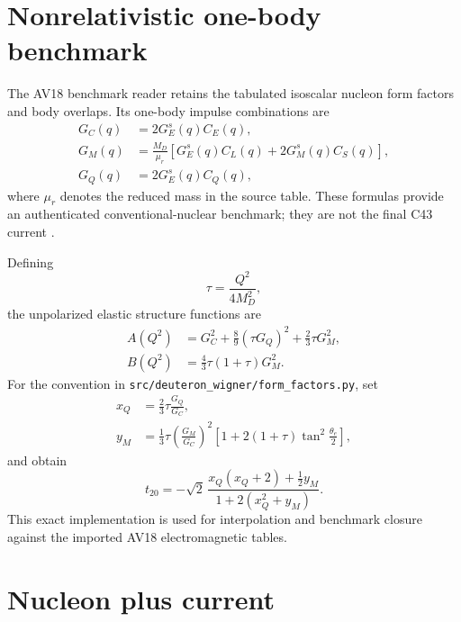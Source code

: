 \documentclass[11pt,oneside]{book}
\newcommand{\codepath}[1]{\nolinkurl{#1}}
\newcommand{\statuscode}[1]{\text{\ttfamily\detokenize{#1}}}
\begin{document}
\section{Nonrelativistic one-body benchmark}

The AV18 benchmark reader retains the tabulated isoscalar nucleon form factors and body overlaps.  Its one-body impulse combinations are
\begin{align}
 G_C(q)&=2G_E^s(q)C_E(q),
 \label{eq:gc-impulse}\\
 G_M(q)&=\frac{M_D}{\mu_r}
 \left[G_E^s(q)C_L(q)+2G_M^s(q)C_S(q)\right],
 \label{eq:gm-impulse}\\
 G_Q(q)&=2G_E^s(q)C_Q(q),
 \label{eq:gq-impulse}
\end{align}
where $\mu_r$ denotes the reduced mass in the source table.  These formulas provide an authenticated conventional-nuclear benchmark; they are not the final C43 current \cite{WiringaStoksSchiavilla1995,Kelly2004,DWProductionBoundary2026}.

Defining
\begin{equation}
 \tau=\frac{Q^2}{4M_D^2},
\end{equation}
the unpolarized elastic structure functions are
\begin{align}
 A(Q^2)&=G_C^2+\frac{8}{9}(\tau G_Q)^2+\frac{2}{3}\tau G_M^2,
 \label{eq:elastic-A}\\
 B(Q^2)&=\frac{4}{3}\tau(1+\tau)G_M^2.
 \label{eq:elastic-B}
\end{align}
For the \statuscode{elastic_observables} convention in \codepath{src/deuteron_wigner/form_factors.py}, set
\begin{align}
 x_Q&=\frac{2}{3}\tau\frac{G_Q}{G_C},\\
 y_M&=\frac{1}{3}\tau\left(\frac{G_M}{G_C}\right)^2
 \left[1+2(1+\tau)\tan^2\frac{\theta_e}{2}\right],
\end{align}
and obtain
\begin{equation}
 t_{20}=-\sqrt{2}\,
 \frac{x_Q(x_Q+2)+\frac12y_M}{1+2(x_Q^2+y_M)}.
 \label{eq:t20-elastic}
\end{equation}
This exact implementation is used for interpolation and benchmark closure against the imported AV18 electromagnetic tables.

\section{Nucleon plus current}
\end{document}
